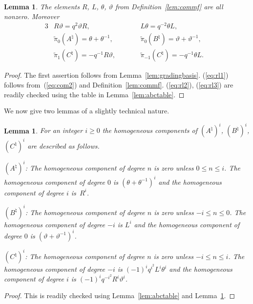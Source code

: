 \documentclass[pdftex]{sigma}
\numberwithin{equation}{section}
\newtheorem{Lemma}[Theorem]{Lemma}
\begin{document}
\begin{Lemma}
\label{lem:comm}
The elements $R$, $L$, $\theta$, $\vartheta$ from
Definition~{\rm \ref{lem:commf}}
are all nonzero. Moreover
\begin{alignat}{3}
& R \vartheta = q^2 \vartheta R,
\qquad &&
L \theta = q^{-2} \theta L, &
\label{eq:rl1}
\\
&\tilde \pi_{0}(A^\natural) = \theta + \theta^{-1},
\qquad && \tilde \pi_{0}(B^\natural) = \vartheta + \vartheta^{-1}, &
\label{eq:rl2}
\\
&
\tilde \pi_{1}(C^\natural) =
-q^{-1} R \vartheta,
\qquad &&
\tilde \pi_{-1}(C^\natural) =
-q^{-1} \theta L.&
\label{eq:rl3}
\end{alignat}
\end{Lemma}
\begin{proof}
The f\/irst assertion
follows from
Lemma~\ref{lem:gradingbasis}.
(\ref{eq:rl1}) follows from~(\ref{eq:com2}) and
Def\/inition~\ref{lem:commf}.
(\ref{eq:rl2}),
(\ref{eq:rl3}) are readily checked using
the table in Lemma~\ref{lem:abctable}.
\end{proof}

We now give two lemmas of a slightly technical
nature.

\begin{Lemma}
\label{lem:aproj}
For an integer $i \geq 0$ the homogeneous components of
$
(A^\natural)^i$,
$(B^\natural)^i$,
$(C^\natural)^i$ are described as follows.

 $(A^\natural)^i$:
The homogeneous component of degree $n$ is zero unless
$0\leq n \leq i$.
The homogeneous component of degree $0$ is
$(\theta + \theta^{-1})^i$
and the homogeneous component of degree $i$ is~$R^i$.

 $(B^\natural)^i$:
The homogeneous component of degree $n$ is zero unless
$-i\leq n \leq 0$.
The homogeneous component of degree $-i$ is
$L^i$
and the
homogeneous component of degree $0$ is
$(\vartheta+ \vartheta^{-1})^i$.

$(C^\natural)^i$:
The homogeneous component of degree $n$ is zero unless
$-i\leq n \leq i$.
The homogeneous component of degree $-i$ is
$(-1)^iq^{i^2}L^i \theta^i$ and the
homogeneous component of degree $i$ is
$(-1)^iq^{-i^2}R^i \vartheta^i$.
\end{Lemma}
\begin{proof}
This is readily checked using
Lemma~\ref{lem:abctable} and
Lemma~\ref{lem:comm}.
\end{proof}
\end{document}

